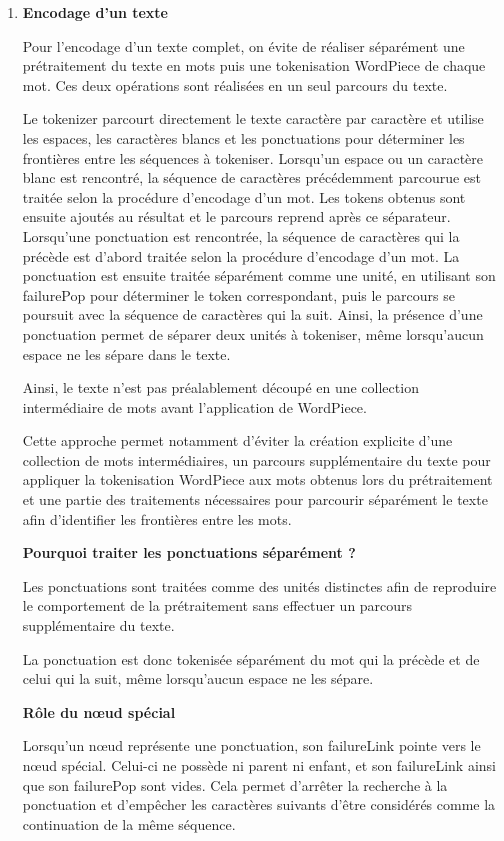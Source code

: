 \documentclass[12pt,a4paper]{report}
\begin{document}
\begin{enumerate}
\begin{itemizeFB}
		\end{itemizeFB}
		
		\textbf{Pourquoi ajouter un espace à la fin ?}
		
		L'espace n'appartient normalement pas au vocabulaire. Il permet donc de provoquer volontairement l'arrêt de la correspondance lorsque la totalité du mot a été parcourue.
		
		\item \textbf{Encodage d'un texte}
		
		Pour l'encodage d'un texte complet, on évite de réaliser séparément une prétraitement du texte en mots puis une tokenisation WordPiece de chaque mot. Ces deux opérations sont réalisées en un seul parcours du texte.
		
		Le tokenizer parcourt directement le texte caractère par caractère et utilise les espaces, les caractères blancs et les ponctuations pour déterminer les frontières entre les séquences à tokeniser. Lorsqu'un espace ou un caractère blanc est rencontré, la séquence de caractères précédemment parcourue est traitée selon la procédure d'encodage d'un mot. Les tokens obtenus sont ensuite ajoutés au résultat et le parcours reprend après ce séparateur. Lorsqu'une ponctuation est rencontrée, la séquence de caractères qui la précède est d'abord traitée selon la procédure d'encodage d'un mot. La ponctuation est ensuite traitée séparément comme une unité, en utilisant son failurePop pour déterminer le token correspondant, puis le parcours se poursuit avec la séquence de caractères qui la suit. Ainsi, la présence d'une ponctuation permet de séparer deux unités à tokeniser, même lorsqu'aucun espace ne les sépare dans le texte.
		
		Ainsi, le texte n'est pas préalablement découpé en une collection intermédiaire de mots avant l'application de WordPiece.
		
		Cette approche permet notamment d'éviter la création explicite d'une collection de mots intermédiaires, un parcours supplémentaire du texte pour appliquer la tokenisation WordPiece aux mots obtenus lors du prétraitement et une partie des traitements nécessaires pour parcourir séparément le texte afin d'identifier les frontières entre les mots.
		
		\textbf{Pourquoi traiter les ponctuations séparément ?}
		
		Les ponctuations sont traitées comme des unités distinctes afin de reproduire le comportement de la prétraitement sans effectuer un parcours supplémentaire du texte.
		
		La ponctuation est donc tokenisée séparément du mot qui la précède et de celui qui la suit, même lorsqu'aucun espace ne les sépare.
		
		\textbf{Rôle du nœud spécial}
		
		Lorsqu'un nœud représente une ponctuation, son failureLink pointe vers le nœud spécial. Celui-ci ne possède ni parent ni enfant, et son failureLink ainsi que son failurePop sont vides. Cela permet d'arrêter la recherche à la ponctuation et d'empêcher les caractères suivants d'être considérés comme la continuation de la même séquence.
		
	\end{enumerate}
	
\end{document}
